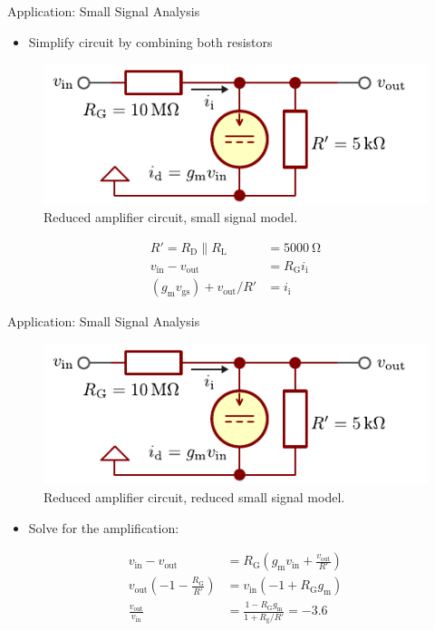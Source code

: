 \begin{frame}{Application: Small Signal Analysis}
    \begin{itemize}
        \item Simplify circuit by combining both resistors
    \end{itemize}
    \begin{figure}
        \centering
        \includegraphics{../assets/mosfet_amplifier_small_signal_reduced.pdf}
        \caption{Reduced amplifier circuit, small signal model.}
        \label{fig:mosfet_amplifier_ac_2}
    \end{figure}

    \begin{align*}
        R'=R_\mathrm{D} \parallel R_\mathrm{L} &= \qty{5000}{\ohm} \\
        v_{\mathrm{in}}-v_{\mathrm{out}}&=R_{\mathrm{G}} i_{\mathrm{i}} \\
        (g_{\mathrm{m}}v_{\mathrm{gs}})+v_{\mathrm{out}} /R'&=i_{\mathrm{i}}
    \end{align*}
\end{frame}

\begin{frame}{Application: Small Signal Analysis}
    \begin{figure}
        \centering
        \includegraphics{../assets/mosfet_amplifier_small_signal_reduced.pdf}
        \caption{Reduced amplifier circuit, reduced small signal model.}
        \label{fig:mosfet_amplifier_ac_reduced}
    \end{figure}
    \begin{itemize}
        \item Solve for the amplification:
    \end{itemize}
    \begin{align*}
        v_{\mathrm{in}}-v_{\mathrm{out}}&=R_{\mathrm{G}}\left( g_{\mathrm{m}}v_{\mathrm{in}}+\frac{v_{\mathrm{out}}}{R'} \right) \\
        v_{\mathrm{out}}\left( -1-\frac{R_{\mathrm{G}}}{R'} \right)&=v_{\mathrm{in}}(-1+R_{\mathrm{G}}g_{\mathrm{m}}) \\
        \frac{v_{\mathrm{out}}}{v_{\mathrm{in}}}&=\frac{1-R_{\mathrm{G}}g_{\mathrm{m}}}{1+R_{\mathrm{g}} / R'}=\num{-3.6}
    \end{align*}
    
\end{frame}